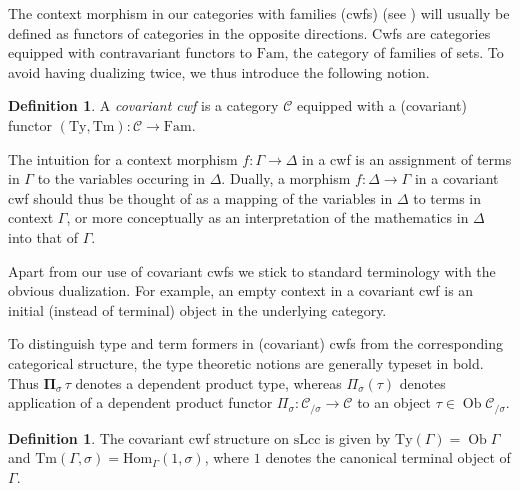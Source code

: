 \documentclass[a4paper]{article}
\theoremstyle{remark}
\theoremstyle{definition}
\newtheorem{definition}[theorem]{Definition}
\begin{document}
The context morphism in our categories with families (cwfs) (see \cite{internal-type-theory}) will usually be defined as functors of categories in the opposite directions.
Cwfs are categories equipped with contravariant functors to $\mathrm{Fam}$, the category of families of sets.
To avoid having dualizing twice, we thus introduce the following notion.
\begin{definition}
  A \emph{covariant cwf} is a category $\mathcal{C}$ equipped with a (covariant) functor $(\mathrm{Ty}, \mathrm{Tm}) : \mathcal{C} \rightarrow \mathrm{Fam}$.
\end{definition}
The intuition for a context morphism $f : \Gamma \rightarrow \Delta$ in a cwf is an assignment of terms in $\Gamma$ to the variables occuring in $\Delta$.
Dually, a morphism $f : \Delta \rightarrow \Gamma$ in a covariant cwf should thus be thought of as a mapping of the variables in $\Delta$ to terms in context $\Gamma$, or more conceptually as an interpretation of the mathematics in $\Delta$ into that of $\Gamma$.

Apart from our use of covariant cwfs we stick to standard terminology with the obvious dualization.
For example, an empty context in a covariant cwf is an initial (instead of terminal) object in the underlying category.

To distinguish type and term formers in (covariant) cwfs from the corresponding categorical structure, the type theoretic notions are generally typeset in bold.
Thus $\mathbf{\Pi}_\sigma \, \tau$ denotes a dependent product type, whereas $\Pi_\sigma(\tau)$ denotes application of a dependent product functor $\Pi_\sigma : \mathcal{C}_{/ \sigma} \rightarrow \mathcal{C}$ to an object $\tau \in \operatorname{Ob} \mathcal{C}_{/ \sigma}$.

\begin{definition}
  The covariant cwf structure on $\mathrm{sLcc}$ is given by $\mathrm{Ty}(\Gamma) = \operatorname{Ob} \Gamma$ and $\mathrm{Tm}(\Gamma, \sigma) = \mathrm{Hom}_\Gamma(1, \sigma)$, where $1$ denotes the canonical terminal object of $\Gamma$.
\end{definition}
\end{document}
